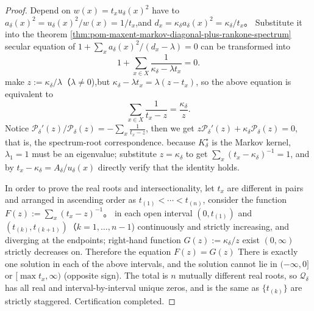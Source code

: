 \begin{proof}
Depend on \(w(x)=t_xu_\delta(x)^2\) have to \(a_\delta(x)^2=u_\delta(x)^2/w(x)=1/t_x\),and
\(
d_x=\kappa_\delta a_\delta(x)^2=\kappa_\delta/t_x
\)。
Substitute it into the theorem \ref{thm:pom-maxent-markov-diagonal-plus-rankone-spectrum} secular equation of
\(
1+\sum_x a_\delta(x)^2/(d_x-\lambda)=0
\)
can be transformed into
\[
1+\sum_{x\in X}\frac{1}{\kappa_\delta-\lambda t_x}=0.
\]
make \(z:=\kappa_\delta/\lambda\)（\(\lambda\ne 0\)),but \(\kappa_\delta-\lambda t_x=\lambda(z-t_x)\), so the above equation is equivalent to
\[
\sum_{x\in X}\frac{1}{t_x-z}=\frac{\kappa_\delta}{z}.
\]
Notice \(\mathcal P_\delta'(z)/\mathcal P_\delta(z)=-\sum_x\frac{1}{t_x-z}\), then we get
\(
z\mathcal P_\delta'(z)+\kappa_\delta\mathcal P_\delta(z)=0
\), that is, the spectrum-root correspondence.
because \(K^\star_\delta\) is the Markov kernel,\(\lambda_1=1\) must be an eigenvalue; substitute \(z=\kappa_\delta\) to get \(\sum_x (t_x-\kappa_\delta)^{-1}=1\), and by \(t_x-\kappa_\delta=A_\delta/u_\delta(x)\) directly verify that the identity holds.
\par
In order to prove the real roots and intersectionality, let \(t_x\) are different in pairs and arranged in ascending order as \(t_{(1)}<\cdots<t_{(n)}\), consider the function \(F(z):=\sum_x (t_x-z)^{-1}\)。
in each open interval \((0,t_{(1)})\) and \((t_{(k)},t_{(k+1)})\)（\(k=1,\dots,n-1\)) continuously and strictly increasing, and diverging at the endpoints;
right-hand function \(G(z):=\kappa_\delta/z\) exist \((0,\infty)\) strictly decreases on.
Therefore the equation \(F(z)=G(z)\) There is exactly one solution in each of the above intervals, and the solution cannot lie in \((-\infty,0]\) or \([\max t_x,\infty)\) (opposite sign).
The total is \(n\) mutually different real roots, so \(\mathcal Q_\delta\) has all real and interval-by-interval unique zeros, and is the same as \(\{t_{(k)}\}\) are strictly staggered. Certification completed.
\end{proof}

